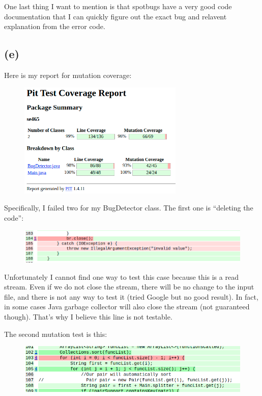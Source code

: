 \documentclass[12pt]{article}
\begin{document}
One last thing I want to mention is that spotbugs have a very good code documentation that I can quickly figure out the exact bug and relavent explanation from the error code. 

\subsection*{(e)}

Here is my report for mutation coverage:
\begin{figure}[H] %
\centering %
\includegraphics[width=0.7\textwidth]{pittest-coverage.png} %
\end{figure}

Specifically, I failed two for my BugDetector class. The first one is ``deleting the code'':

\begin{figure}[H] %
\centering %
\includegraphics[width=1\textwidth]{mutation1.png} %
\end{figure}

Unfortunately I cannot find one way to test this case because this is a read stream. Even if we do not close the stream, there will be no change to the input file, and there is not any way to test it (tried Google but no good result). In fact, in some cases Java garbage collector will also close the stream (not guaranteed though). That's why I believe this line is not testable.

The second mutation test is this:
\begin{figure}[H] %
\centering %
\includegraphics[width=1\textwidth]{mutation2.png} %
\end{figure}
\end{document}
